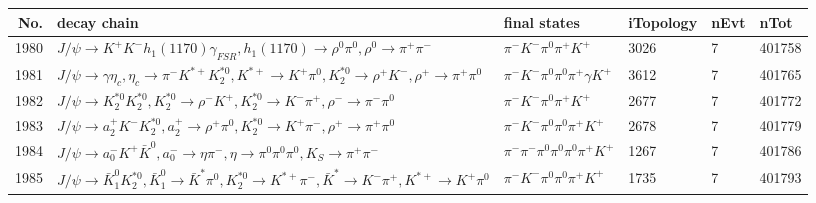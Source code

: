 \begin{table}[htbp] 
\begin{center}
\begin{small}
\begin{tabular}{rlllll}\hline\hline
 No. & decay chain & final states &  iTopology & nEvt & nTot \\\hline
1980&$J/\psi       \rightarrow K^{+}          K^{-}          h_{1}(1170)    \gamma_{FSR} , h_{1}(1170)     \rightarrow \rho^{0}      \pi^{0}        , \rho^{0}       \rightarrow \pi^{+}        \pi^{-}        $&$\pi^{-}        K^{-}          \pi^{0}        \pi^{+}        K^{+}          $& 3026&    7&401758\\
1981&$J/\psi       \rightarrow \gamma       \eta_{c}    , \eta_{c}     \rightarrow \pi^{-}        K^{*+}         K_2^{*0}       , K^{*+}          \rightarrow K^{+}          \pi^{0}        , K_2^{*0}        \rightarrow \rho^{+}      K^{-}          , \rho^{+}       \rightarrow \pi^{+}        \pi^{0}        $&$\pi^{-}        K^{-}          \pi^{0}        \pi^{0}        \pi^{+}        \gamma       K^{+}          $& 3612&    7&401765\\
1982&$J/\psi       \rightarrow K_2^{*0}       K_2^{*0}       , K_2^{*0}        \rightarrow \rho^{-}      K^{+}          , K_2^{*0}        \rightarrow K^{-}          \pi^{+}        , \rho^{-}       \rightarrow \pi^{-}        \pi^{0}        $&$\pi^{-}        K^{-}          \pi^{0}        \pi^{+}        K^{+}          $& 2677&    7&401772\\
1983&$J/\psi       \rightarrow a_{2}^{+}      K^{-}          K_2^{*0}       , a_{2}^{+}       \rightarrow \rho^{+}      \pi^{0}        , K_2^{*0}        \rightarrow K^{+}          \pi^{-}        , \rho^{+}       \rightarrow \pi^{+}        \pi^{0}        $&$\pi^{-}        K^{-}          \pi^{0}        \pi^{0}        \pi^{+}        K^{+}          $& 2678&    7&401779\\
1984&$J/\psi       \rightarrow a_{0}^{-}      K^{+}          \bar{K}^{0}   , a_{0}^{-}       \rightarrow \eta          \pi^{-}        , \eta           \rightarrow \pi^{0}        \pi^{0}        \pi^{0}        , K_{S}           \rightarrow \pi^{+}        \pi^{-}        $&$\pi^{-}        \pi^{-}        \pi^{0}        \pi^{0}        \pi^{0}        \pi^{+}        K^{+}          $& 1267&    7&401786\\
1985&$J/\psi       \rightarrow \bar{K}_1^{0} K_2^{*0}       , \bar{K}_1^{0}  \rightarrow \bar{K}^{*}   \pi^{0}        , K_2^{*0}        \rightarrow K^{*+}         \pi^{-}        , \bar{K}^{*}    \rightarrow K^{-}          \pi^{+}        , K^{*+}          \rightarrow K^{+}          \pi^{0}        $&$\pi^{-}        K^{-}          \pi^{0}        \pi^{0}        \pi^{+}        K^{+}          $& 1735&    7&401793\\

\end{tabular}
\end{small}
\end{center}
\end{table}
